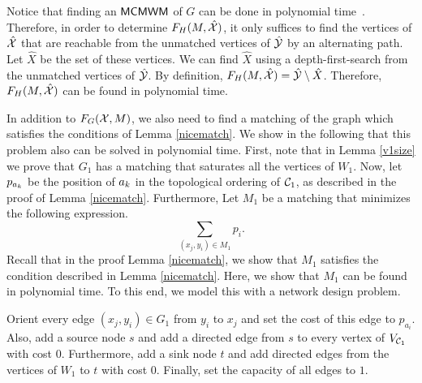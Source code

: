 \begin{comment}
First, note that an $\MCMWM$ of $G$ can be found in polynomial time using standard methods for finding minimum cost maxmimum flow in networks. For this, create a networks as follows: Orient every edge $(\itemv_j,\agentv_i)$ from $\agentv_i$ to $\itemv_j$, with cost $-w(\itemv_j,\agentv_i)$ and capacity $1$. Also, add a source node $s$ and connect it to all the vertices in $\parttwo$ with cost $0$ and capacity $1$ and add a sink node $t$ and connect every vertex in $\partone$ to $t$, with cost $0$ and capacity $1$. It is easy to observe that the edges between $\partone$ and $\parttwo$ with non-zero flow in a Min Cost Maximum Flow from $s$ to $t$ in this network form a maximum cardinality matching $M$. In addition to this, since the maximum flow was minimum cost, 
$$\sum_{(\itemv_j,\agentv_i) \in M} -w(\itemv_j,\agentv_i)$$
is minimized, which means 
$$\sum_{(\itemv_j,\agentv_i) \in M} w(\itemv_j,\agentv_i)$$
is maximized in $M$. So, $M$ is a $\MCMWM$ of $H$. 
\end{comment}

Notice that finding an $\textsf{MCMWM}$ of $G$ can be done in polynomial time~\cite{west2001introduction}. Therefore, in order to determine $F_H(M,\hat{\mathcal{X}})$, it only suffices to find the vertices of $\hat{\mathcal{X}}$ that are reachable from the unmatched vertices of $\hat{\mathcal{Y}}$ by an alternating path. Let $\hat{X}$ be the set of these vertices. We can find $\hat{X}$ using a depth-first-search from the unmatched vertices of $\hat{\mathcal{Y}}$. By definition, $F_H(M,\hat{\mathcal{X}}) = \hat{\mathcal{Y}} \setminus \hat{X}$. Therefore, $F_H(M,\hat{\mathcal{X}})$ can be found in polynomial time.

In addition to $F_G(\mathcal{X},M)$, we also need to find a matching of the graph which satisfies the conditions of Lemma \ref{nicematch}. We show in the following that this problem also can be solved in polynomial time. First, note that in Lemma \ref{v1size} we prove that $G_1$ has a matching that saturates all the vertices of $W_1$. Now, let $p_{a_k}$ be the position of $a_k$ in the topological ordering of $\mathcal{C}_1$, as described in the proof of Lemma \ref{nicematch}. Furthermore, Let $M_1$ be a matching that minimizes the following expression.
$$ \sum_{(x_j,y_i) \in M_1} p_i.$$ Recall that in the proof Lemma \ref{nicematch}, we show that $M_1$ satisfies the condition described in Lemma \ref{nicematch}. Here, we show that $M_1$ can be found in polynomial time. To this end, we model this with a network design problem. 

Orient every edge $(x_j,y_i) \in G_1$ from $y_i$ to $x_j$ and set the cost of this edge to $p_{a_i}$. Also, add a source node $s$ and add a directed edge from $s$  to every vertex of $V_{\mathcal{C}_1}$ with cost $0$. Furthermore, add a sink node $t$ and add directed edges from the vertices of $W_1$ to $t$ with cost $0$. Finally, set the capacity of all edges to $1$. 


